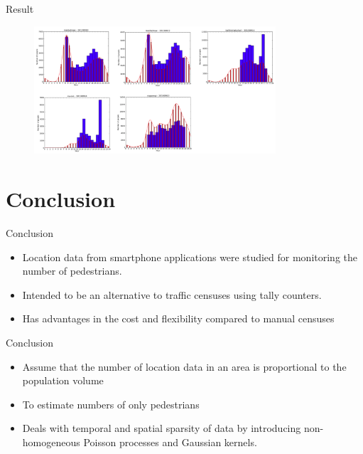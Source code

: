 \begin{frame}{Result}

\begin{figure}
\includegraphics[width = 9cm]{pic16.png}
\end{figure}

\end{frame}

\section{Conclusion}\label{conclusion}

\begin{frame}{Conclusion}

\begin{itemize}
\itemsep1pt\parskip0pt
\item
  Location data from smartphone applications were studied for monitoring
  the number of pedestrians.
\item
  Intended to be an alternative to traffic censuses using tally
  counters.
\item
  Has advantages in the cost and flexibility compared to manual censuses
\end{itemize}

\end{frame}

\begin{frame}{Conclusion}

\begin{itemize}
\itemsep1pt\parskip0pt
\item
  Assume that the number of location data in an area is proportional to
  the population volume
\item
  To estimate numbers of only pedestrians
\item
  Deals with temporal and spatial sparsity of data by introducing
  non-homogeneous Poisson processes and Gaussian kernels.
\end{itemize}

\end{frame}
